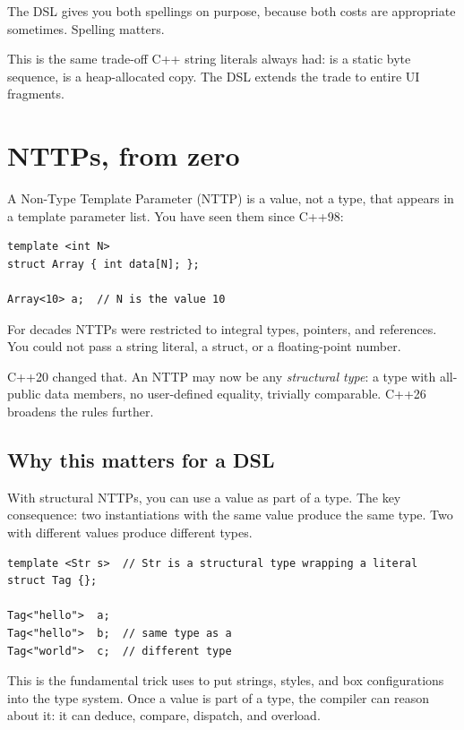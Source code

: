 The DSL gives you both spellings on purpose, because both costs
are appropriate sometimes. Spelling matters.

\begin{aside}
This is the same trade-off C++ string literals always had:
 is a static byte sequence, 
is a heap-allocated copy. The DSL extends the trade to entire
UI fragments.
\end{aside}

\section{NTTPs, from zero}

A Non-Type Template Parameter (NTTP) is a value, not a type, that
appears in a template parameter list. You have seen them since
C++98:

\begin{lstlisting}
template <int N>
struct Array { int data[N]; };

Array<10> a;  // N is the value 10
\end{lstlisting}

For decades NTTPs were restricted to integral types, pointers,
and references. You could not pass a string literal, a struct,
or a floating-point number.

C++20 changed that. An NTTP may now be any \emph{structural
type}: a type with all-public data members, no user-defined
equality, trivially comparable. C++26 broadens the rules further.

\subsection*{Why this matters for a DSL}

With structural NTTPs, you can use a value as part of a type.
The key consequence: two instantiations with the same value
produce the same type. Two with different values produce
different types.

\begin{lstlisting}
template <Str s>  // Str is a structural type wrapping a literal
struct Tag {};

Tag<"hello">  a;
Tag<"hello">  b;  // same type as a
Tag<"world">  c;  // different type
\end{lstlisting}

This is the fundamental trick \maya{} uses to put strings,
styles, and box configurations into the type system. Once a
value is part of a type, the compiler can reason about it: it
can deduce, compare, dispatch, and overload.

